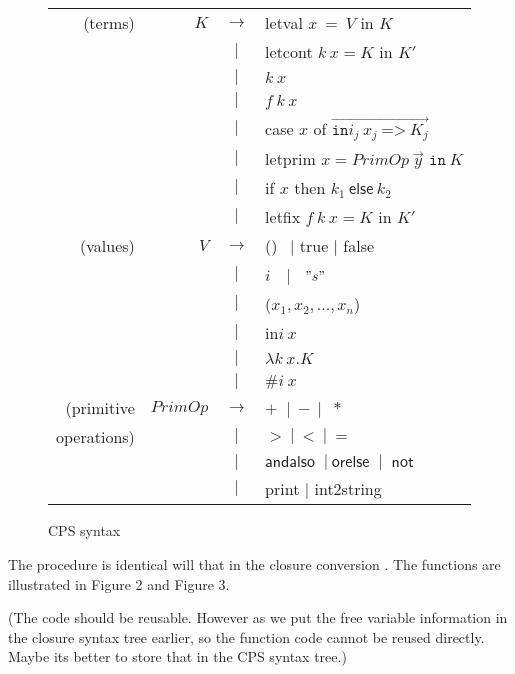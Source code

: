 \documentclass{article}
\theoremstyle{definition}
\theoremstyle{remark}
\numberwithin{equation}{section}
\begin{document}
\begin{figure}[!ht]
  \centering
\begin{tabular}{rrcl}
(terms) & $K$ & $\to$ & \textsf{letval }$x\ =\ V$ \textsf{ in } $K$ \\
        &     & $|$ & \textsf{letcont }$k\ x = K$\textsf{ in }$K'$\\
        &     & $|$ &  $k\ x$ \\
        &     & $|$ & $f\ k\ x$ \\
        &     & $|$ & \textsf{case} $x$ \textsf{of}
            $\overrightarrow{\texttt{in}i_j\ x_j\ \texttt{=>}\ K_j}$\\
        &     & $|$ & \textsf{letprim} $x=PrimOp\ \vec{y}
         \texttt{ in}\ K$\\
        &     & $|$ &\textsf{if} $x$ \textsf{then} $k_1\ \textsf{else}\ k_2$\\
        &     & $|$ &\textsf{letfix }$f\ k\ x=K$\textsf{ in }$K'$\\

(values) & $V$ & $\to$ & () $\ \ |$ \textsf{ true } $|$ \textsf{ false}\\
        &     & $|$ & $i\ \ $ $\ |\ $  $\ "s"$\\
        &     & $|$ & ($x_1,x_2, ..., x_n$)\\
        &     & $|$ & \textsf{in}$i\ x$\\
        &     & $|$ &  $\lambda k\ x.K$ \\
        &     & $|$ &  $\texttt{\#}i\ x$ \\

(primitive & $PrimOp$ & $\to$ & $+\ $ $|\ -\ |$ $\ *$\\
operations) &     & $|$ & $>\ |\ <\ |\ =$\\
        &     & $|$ & $\textsf{andalso }\ |\ \textsf{orelse }\ |\ \textsf{ not}$\\
        &     & $|$ & \textsf{print} $|$ \textsf{int2string}\\
\end{tabular}
  \caption{CPS syntax}
  \label{fig-sub}
\end{figure}

The procedure is identical will that in the closure conversion
. The functions are illustrated in Figure 2 and Figure 3.

 (The code should be reusable. However as we put the free variable information in the
  closure syntax tree earlier, so the function code cannot be reused directly. Maybe its
  better to store that in the CPS syntax tree.)
\end{document}
